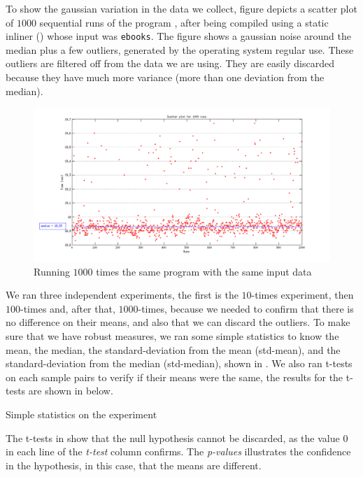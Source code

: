
To show the gaussian variation in the data we collect, figure  depicts a scatter plot of $1000$ sequential runs of the program \bzip, after being compiled using a static inliner (\llvm) whose input was {\tt ebooks}. The figure shows a gaussian noise around the median plus a few outliers, generated by the operating system regular use. These outliers are filtered off from the data we are using. They are easily discarded because they have much more variance (more than one deviation from the median).

\begin{figure}
  \centering
  \includegraphics[width=1.00\linewidth]{Figures/1000Runs}
  \caption{Running $1000$ times the same program with the same input data}
  \label{fig:gauss}
\end{figure}

We ran three independent experiments, the first is the $10$-times experiment, then $100$-times and, after that, $1000$-times, because we needed to confirm that there is no difference on their means, and also that we can discard the outliers. To make sure that we have robust measures, we ran some simple statistics to know the mean, the median, the standard-deviation from the mean (std-mean), and the standard-deviation from the median (std-median), shown in . We also ran t-tests on each sample pairs to verify if their means were the same, the results for the t-tests are shown in  below.

\begin{table}
  \centering
  \begin{tiny}
  
  \end{tiny}
  \caption{Simple statistics on the experiment}
  \label{tab:robustTest}
\end{table}

The t-tests in  show that the null hypothesis cannot be discarded, as the value $0$ in each line of the \emph{t-test} column confirms. The \emph{p-values} illustrates the confidence in the hypothesis, in this case, that the means are different.

